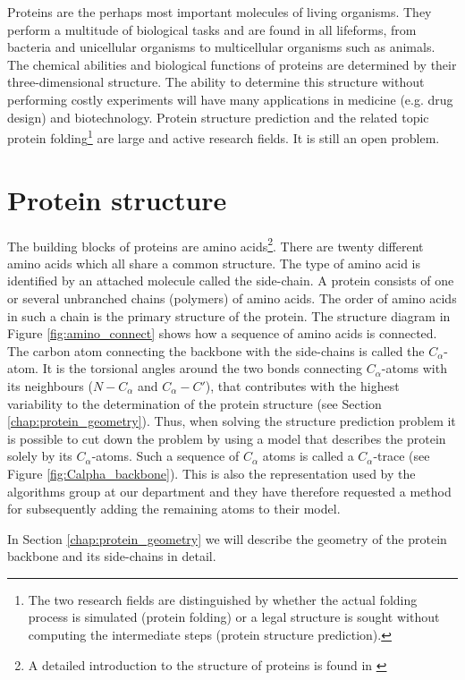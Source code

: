 Proteins are the perhaps most important molecules of living
organisms. They perform a multitude of biological tasks and are found
in all lifeforms, from bacteria and unicellular organisms to
multicellular organisms such as animals. The chemical abilities and
biological functions of proteins are determined by their
three-dimensional structure. The ability to determine this structure
without performing costly experiments will have many applications in
medicine (e.g. drug design) and biotechnology. Protein structure
prediction and the related topic protein folding\footnote{The two
  research fields are distinguished by whether the actual folding
  process is simulated (protein folding) or a legal structure is
  sought without computing the intermediate steps (protein structure
  prediction).} are large and active research fields. It is still an
open problem.

\section{Protein structure}
The building blocks of proteins are amino acids\footnote{A detailed
  introduction to the structure of proteins is found in
  \cite{branden}}. There are twenty different amino acids which all
share a common structure. The type of amino acid is identified by an
attached molecule called the side-chain. A protein consists of one or
several unbranched chains (polymers) of amino acids. The order of
amino acids in such a chain is the primary structure of the protein.
The structure diagram in Figure \ref{fig:amino_connect} shows how a
sequence of amino acids is connected. The carbon atom connecting the
backbone with the side-chains is called the $C_\alpha$-atom. It is the
torsional angles around the two bonds connecting $C_\alpha$-atoms with
its neighbours ($N-C_\alpha$ and $C_\alpha-C'$), that contributes with
the highest variability to the determination of the protein structure
(see Section \ref{chap:protein_geometry}). Thus, when solving the
structure prediction problem it is possible to cut down
the problem by using a model that describes the protein solely by its
$C_\alpha$-atoms. Such a sequence of $C_{\alpha}$ atoms is called a
$C_{\alpha}$-trace (see Figure \ref{fig:Calpha_backbone}). This is
also the representation used by the algorithms group at our department
and they have therefore requested a method for subsequently adding the
remaining atoms to their model.

In Section \ref{chap:protein_geometry} we will describe the geometry
of the protein backbone and its side-chains in detail.

